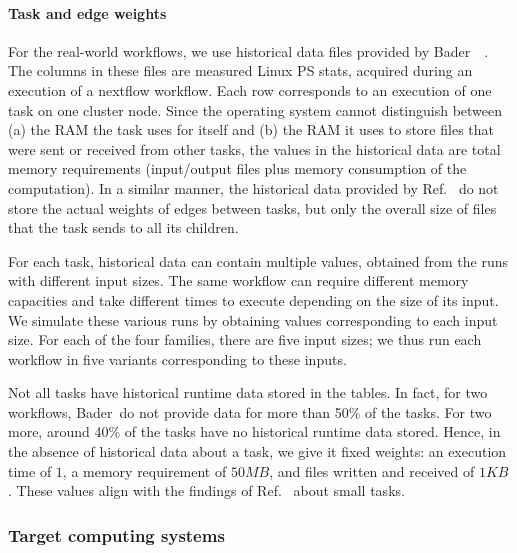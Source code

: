 \documentclass[conference]{IEEEtran}
\newcommand{\skug}[1]{{\color{blue}[SK: #1]}}
\begin{document}
\paragraph{Task and edge weights}
For the real-world workflows, we use historical data files provided by Bader~\etal~\cite{lotaru}.
The columns in these files are measured Linux PS stats, acquired during an execution of a nextflow workflow.
Each row corresponds to an execution of one task on one cluster node.
Since the operating system cannot distinguish between (a) the RAM the task uses for itself and (b) the RAM it uses
to store files that were sent or received from other tasks, the values in the historical data are total memory requirements (input/output files plus memory consumption of the computation).
In a similar manner, the historical data provided by Ref.~\cite{lotaru} do not store the actual weights of edges between tasks, but only the overall
size of files that the task sends to all its children.

For each task, historical data can contain multiple values, obtained from the runs with different input sizes.
The same workflow can require different memory capacities and take different times to execute
depending on the size of its input.
We simulate these various runs by obtaining values corresponding to each input size.
For each of the four families, there are five input sizes; we thus run each workflow in five variants corresponding to these inputs.

Not all tasks have historical runtime data stored in the tables.
In fact, for two workflows, Bader~\etal do not provide data for more than 50\% of the tasks.
For two more, around 40\% of the tasks have no historical runtime data stored.
Hence, in the absence of historical data about a task, we give it fixed weights:
an execution time of $1$, a memory requirement of $50 MB$, and files written and received of $1KB$.
These values align with the findings of Ref.~\cite{lotaru} about small tasks.


\subsubsection{Target computing systems}
\end{document}
